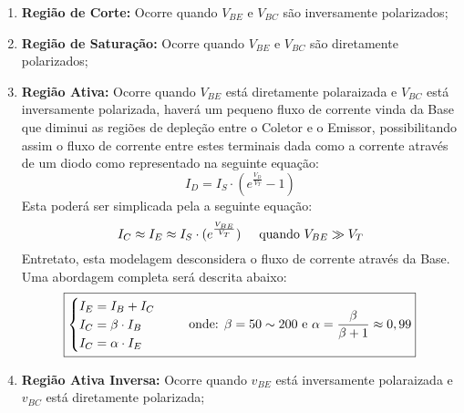 \documentclass{article}
\begin{document}
                \begin{enumerate}[rightmargin = \leftmargin]
                    \item \textbf{Região de Corte:} Ocorre quando $V_{BE}$ e $V_{BC}$ são inversamente polarizados;
                    \item \textbf{Região de Saturação:} Ocorre quando $V_{BE}$ e $V_{BC}$ são diretamente polarizados;
                    \item \textbf{Região Ativa:} Ocorre quando $V_{BE}$ está diretamente polaraizada e $V_{BC}$ está inversamente polarizada, haverá um pequeno fluxo de corrente vinda da Base que diminui as regiões de depleção entre o Coletor e o Emissor, possibilitando assim o fluxo de corrente entre estes terminais dada como a corrente através de um diodo como representado na seguinte equação:
                        \[
                            I_{D} = I_{S} \cdot (e^{\frac{V_{D}}{V_{T}}} - 1)
                        \]
                    Esta poderá ser simplicada pela a seguinte equação:
                        \begin{equation}
                            I_{C} \approx I_{E} \approx I_{S} \cdot (e^{\frac{V_{BE}}{V_{T}}})
                            \hspace{5mm}
                            \text{quando $V_{BE} \gg V_{T}$}
                        \end{equation}
                    Entretato, esta modelagem desconsidera o fluxo de corrente através da Base. Uma abordagem completa será descrita abaixo:
                        \begin{align}
                            \boxed{
                                \begin{cases}
                                    I_{E} = I_{B} + I_{C}\\
                                    I_{C} = \beta \cdot I_{B}\\
                                    I_{C} = \alpha \cdot I_{E}\\
                                \end{cases}
                                \hspace{5mm}
                                \text{onde: $\beta = 50 \sim 200$ e $\alpha = \frac{\beta}{\beta + 1} \approx 0,99$}
                            }
                        \end{align}
                    \item \textbf{Região Ativa Inversa:} Ocorre quando $v_{BE}$ está inversamente polaraizada e $v_{BC}$ está diretamente polarizada;
                \end{enumerate}
\end{document}

